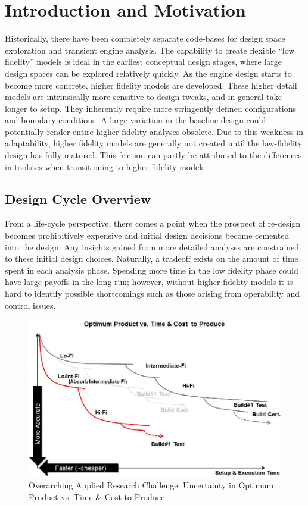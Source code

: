 \documentclass[heading.tex]{subfiles}
\begin{document}

\section{Introduction and Motivation}
Historically, there have been completely separate code-bases for design space exploration and
transient engine analysis. The capability to create flexible ``low fidelity'' models is ideal in
the earliest  conceptual design stages, where large design spaces can be explored relatively
quickly. As the engine design starts to become more concrete, higher fidelity models are
developed. These higher detail models are intrinsically more sensitive to design tweaks, and in
general take longer to setup. They inherently require more stringently defined configurations
and boundary conditions. A large variation in the baseline design could
potentially render entire higher fidelity analyses obsolete. Due to this weakness in adaptability,
higher fidelity models are generally not created until the low-fidelity design has fully matured.
This friction can partly be attributed to the differences in toolstes when transitioning to higher
fidelity models. 

\subsection{Design Cycle Overview}

	From a life-cycle perspective, there comes a point when the prospect of re-design becomes
prohibitively expensive and initial design decisions become cemented into the design. Any insights
gained from more detailed analyses are constrained to these initial design choices. Naturally, a
tradeoff exists on the amount of time spent in each analysis phase. Spending more time in the low
fidelity phase could have large payoffs in the long run; however, without higher fidelity models
it is hard to identify possible shortcomings such as those arising from operability and control
issues.

\begin{figure}[H]
\centering
\includegraphics[width=1.0\textwidth]{images/optimum_product_vs_time}
\caption{Overarching Applied Research Challenge: Uncertainty in Optimum Product vs. Time \& Cost to Produce}
\label{f:product_vs_time}
\end{figure}
\end{document}
